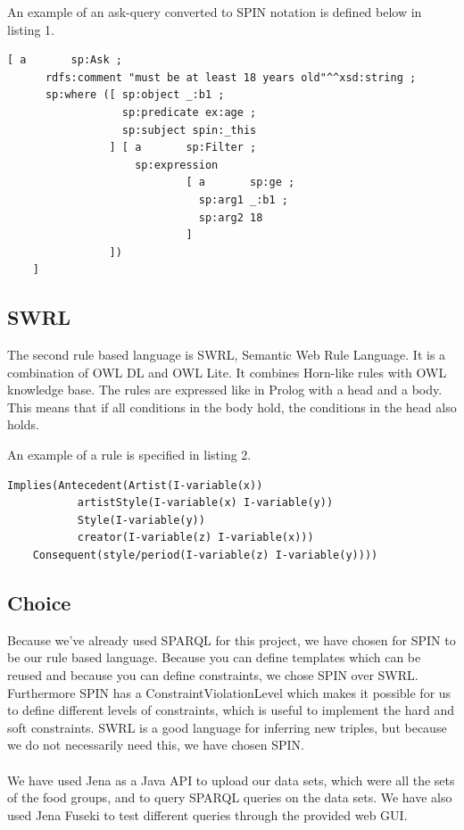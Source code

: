 An example of an ask-query converted to SPIN notation is defined below in listing 1.

\begin{lstlisting}[caption={Example of query using SPIN}]
[ a       sp:Ask ;
      rdfs:comment "must be at least 18 years old"^^xsd:string ;
      sp:where ([ sp:object _:b1 ;
                  sp:predicate ex:age ;
                  sp:subject spin:_this
                ] [ a       sp:Filter ;
                    sp:expression
                            [ a       sp:ge ;
                              sp:arg1 _:b1 ;
                              sp:arg2 18
                            ]
                ])
    ]
\end{lstlisting}
\subsection*{SWRL}
The second rule based language is SWRL, Semantic Web Rule Language. It is a combination of OWL DL and OWL Lite. It combines Horn-like rules with OWL knowledge base. The rules are expressed like in Prolog with a head and a body. This means that if all conditions in the body hold, the conditions in the head also holds. 

An example of a rule is specified in listing 2.
\begin{lstlisting}[caption={Example of query using SWRL}]
Implies(Antecedent(Artist(I-variable(x)) 
		   artistStyle(I-variable(x) I-variable(y))
		   Style(I-variable(y))
		   creator(I-variable(z) I-variable(x)))
	Consequent(style/period(I-variable(z) I-variable(y))))
\end{lstlisting}

\subsection*{Choice}
Because we've already used SPARQL for this project, we have chosen for SPIN to be our rule based language. Because you can define templates which can be reused and because you can define constraints, we chose SPIN over SWRL. Furthermore SPIN has a ConstraintViolationLevel which makes it possible for us to define different levels of constraints, which is useful to implement the hard and soft constraints. SWRL is a good language for inferring new triples, but because we do not necessarily need this, we have chosen SPIN.
\\ \\ 
We have used Jena as a Java API to upload our data sets, which were all the sets of the food groups, and to query SPARQL queries on the data sets. We have also used Jena Fuseki to test different queries through the provided web GUI. 

